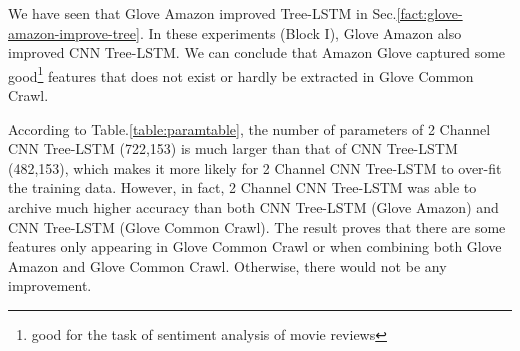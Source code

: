\label{proved:Amazon-adv-Common}
We have seen that Glove Amazon improved Tree-LSTM in Sec.\ref{fact:glove-amazon-improve-tree}.
In these experiments (Block I), Glove Amazon also improved CNN Tree-LSTM.
We can conclude that Amazon Glove captured some good\footnote{good for the task of sentiment analysis of movie reviews} features that does not exist or hardly be extracted in Glove Common Crawl.

According to Table.\ref{table:paramtable}, the number of parameters of 2 Channel CNN Tree-LSTM (722,153) is much larger than that of CNN Tree-LSTM (482,153), which makes it more likely for 2 Channel CNN Tree-LSTM to over-fit the training data.
However, in fact, 2 Channel CNN Tree-LSTM was able to archive much higher accuracy than both CNN Tree-LSTM (Glove Amazon) and CNN Tree-LSTM (Glove Common Crawl).\label{proved:Common-syn-Amazon}
The result proves that there are some features only appearing in Glove Common Crawl or when combining both Glove Amazon and Glove Common Crawl.
Otherwise, there would not be any improvement.
